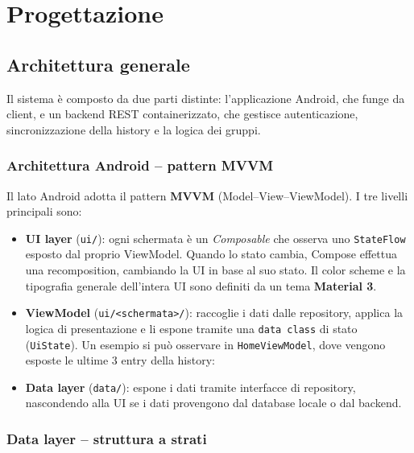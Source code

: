 \section{Progettazione}
\label{sec:progettazione}

\subsection{Architettura generale}

Il sistema è composto da due parti distinte: l'applicazione Android, che funge da client, e un backend REST containerizzato, che gestisce autenticazione, sincronizzazione della history e la logica dei gruppi.

\subsubsection*{Architettura Android -- pattern MVVM}

Il lato Android adotta il pattern \textbf{MVVM} (Model--View--ViewModel). I tre livelli principali sono:

\begin{itemize}[label={--}, leftmargin=1.2cm]
    \item \textbf{UI layer} (\texttt{ui/}): ogni schermata è un \emph{Composable} che osserva uno \texttt{StateFlow} esposto dal proprio ViewModel. Quando lo stato cambia, Compose effettua una recomposition, cambiando la UI in base al suo stato. Il color scheme e la tipografia generale dell'intera UI sono definiti da un tema \textbf{Material 3}.

    \item \textbf{ViewModel} (\texttt{ui/<schermata>/}): raccoglie i dati dalle repository, applica la logica di presentazione e li espone tramite una \texttt{data class} di stato (\texttt{UiState}). Un esempio si può osservare in \texttt{HomeViewModel}, dove vengono esposte le ultime 3 entry della history:


    \item \textbf{Data layer} (\texttt{data/}): espone i dati tramite interfacce di repository, nascondendo alla UI se i dati provengono dal database locale o dal backend.
\end{itemize}

\subsubsection*{Data layer -- struttura a strati}

